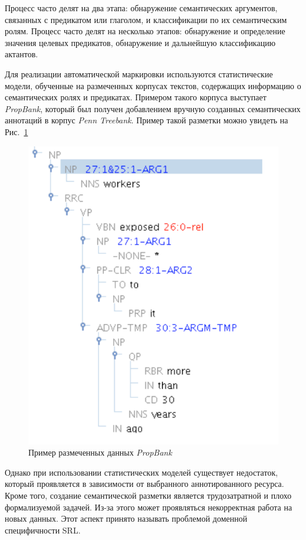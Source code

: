 Процесс часто делят на два этапа: обнаружение семантических аргументов, связанных с предикатом или глаголом, и классификации по их семантическим ролям. 
Процесс часто делят на несколько этапов:  обнаружение и определение значения целевых предикатов, обнаружение и дальнейшую классификацию актантов. 

Для реализации автоматической маркировки используются статистические модели, обученные на размеченных корпусах текстов, содержащих информацию о семантических ролях и предикатах. Примером такого корпуса выступает \emph{PropBank}, который был получен добавлением вручную созданных семантических аннотаций в корпус \emph{Penn Treebank}. Пример такой разметки можно увидеть на Рис.~\ref{fig:redrelex}

\begin{figure}[t]
\centering
\includegraphics[scale=0.5]{img/redrelex.png}
\caption{\label{fig:redrelex}Пример размеченных данных \emph{PropBank}}
\end{figure}

Однако при использовании статистических моделей существует недостаток, который проявляется в зависимости от выбранного аннотированного ресурса. Кроме того, создание семантической разметки является трудозатратной и плохо формализуемой задачей. Из-за этого может проявляться некорректная работа на новых данных. Этот аспект принято называть проблемой доменной специфичности SRL.

